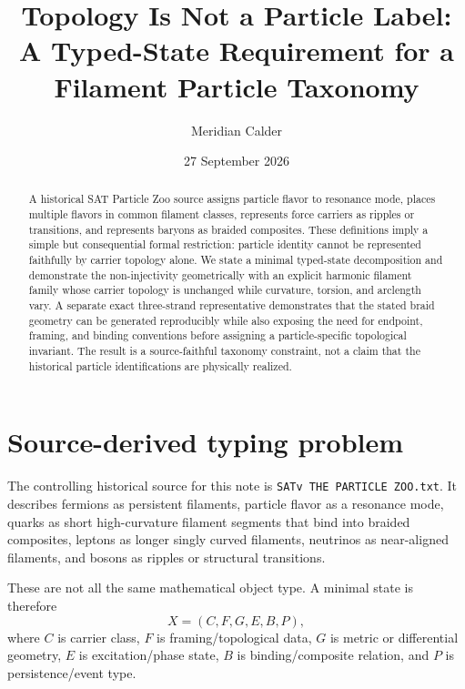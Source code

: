 \documentclass[aps,prd,reprint,floatfix,nofootinbib]{revtex4-2}
\begin{document}
\title{Topology Is Not a Particle Label: A Typed-State Requirement for a Filament Particle Taxonomy}
\author{Meridian Calder}
\date{27 September 2026}

\begin{abstract}
A historical SAT Particle Zoo source assigns particle flavor to resonance mode,
places multiple flavors in common filament classes, represents force carriers
as ripples or transitions, and represents baryons as braided composites.
These definitions imply a simple but consequential formal restriction:
particle identity cannot be represented faithfully by carrier topology alone.
We state a minimal typed-state decomposition and demonstrate the
non-injectivity geometrically with an explicit harmonic filament family whose
carrier topology is unchanged while curvature, torsion, and arclength vary.
A separate exact three-strand representative demonstrates that the stated
braid geometry can be generated reproducibly while also exposing the need for
endpoint, framing, and binding conventions before assigning a particle-specific
topological invariant. The result is a source-faithful taxonomy constraint,
not a claim that the historical particle identifications are physically realized.
\end{abstract}

\maketitle

\section{Source-derived typing problem}

The controlling historical source for this note is
\texttt{SATv THE PARTICLE ZOO.txt}.
It describes fermions as persistent filaments, particle flavor as a resonance
mode, quarks as short high-curvature filament segments that bind into braided
composites, leptons as longer singly curved filaments, neutrinos as near-aligned
filaments, and bosons as ripples or structural transitions.

These are not all the same mathematical object type. A minimal state is
therefore
\begin{equation}
X=(C,F,G,E,B,P),
\end{equation}
where $C$ is carrier class, $F$ is framing/topological data, $G$ is metric or
differential geometry, $E$ is excitation/phase state, $B$ is binding/composite
relation, and $P$ is persistence/event type.
\end{document}
